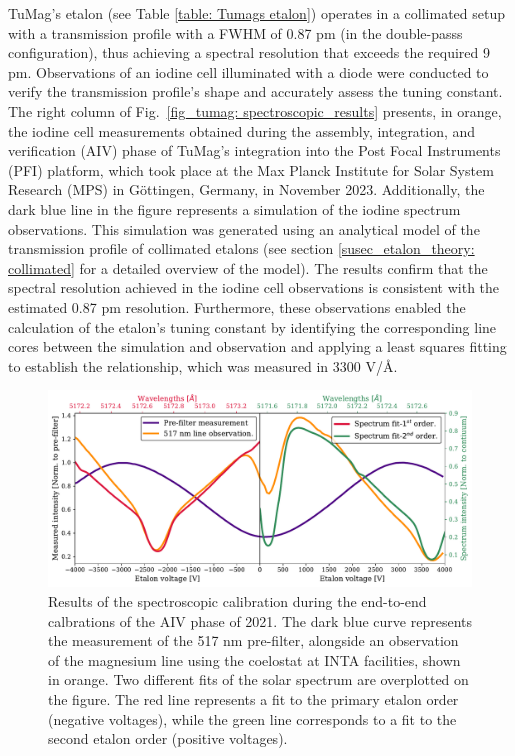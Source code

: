 TuMag's etalon (see Table \ref{table: Tumags etalon}) operates in a collimated setup with a transmission profile with a FWHM of 0.87 pm (in the double-passs configuration), thus achieving a spectral resolution that exceeds the required 9 pm. Observations of an iodine cell illuminated with a diode were conducted to verify the transmission profile's shape and accurately assess the tuning constant. The right column of Fig.~\ref{fig_tumag: spectroscopic_results} presents, in orange, the iodine cell measurements obtained during the assembly, integration, and verification (AIV) phase of TuMag's integration into the Post Focal Instruments (PFI) platform, which took place at the Max Planck Institute for Solar System Research (MPS) in Göttingen, Germany, in November 2023. Additionally, the dark blue line in the figure represents a simulation of the iodine spectrum observations. This simulation was generated using an analytical model of the transmission profile of collimated etalons (see section \ref{susec_etalon_theory: collimated} for a detailed overview of the model). The results confirm that the spectral resolution achieved in the iodine cell observations is consistent with the estimated 0.87 pm resolution. Furthermore, these observations enabled the calculation of the etalon's tuning constant by identifying the corresponding line cores between the simulation and observation and applying a least squares fitting to establish the relationship, which was measured in 3300 V/\r{A}.

\begin{figure}[t]
    \includegraphics[width=\textwidth]{figures/TuMag/secondorder.pdf}
    \caption[Etalon's second order in magnesium measurements.]{
      Results of the spectroscopic calibration during the end-to-end calbrations of the AIV phase of 2021. The dark blue curve represents the measurement of the 517 nm pre-filter, alongside an observation of the magnesium line using the coelostat at INTA facilities, shown in orange. Two different fits of the solar spectrum are overplotted on the figure. The red line represents a fit to the primary etalon order (negative voltages), while the green line corresponds to a fit to the second etalon order (positive voltages).      
      \label{fig_tumag:second-order_cont}}
\end{figure}

